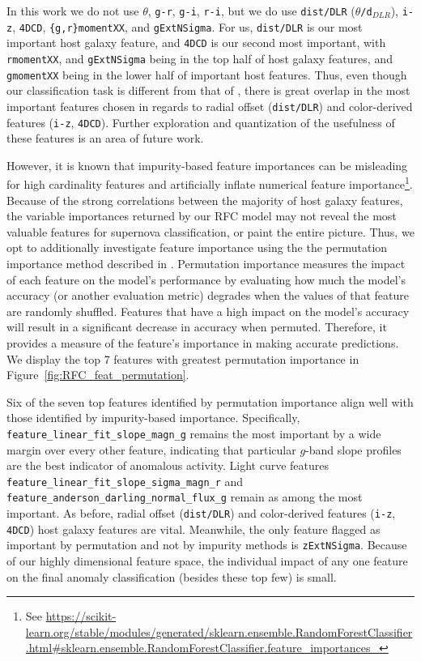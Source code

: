 \documentclass[twocolumn]{aastex63}
\begin{document}
In this work we do not use \texttt{$\theta$}, \texttt{g-r}, \texttt{g-i}, \texttt{r-i}, but we do use \texttt{dist/DLR} (\texttt{$\theta$/d$_{DLR}$}), \texttt{i-z}, \texttt{4DCD}, \texttt{\{g,r\}momentXX}, and \texttt{gExtNSigma}. For us, \texttt{dist/DLR} is our most important host galaxy feature, and \texttt{4DCD} is our second most important, with \texttt{rmomentXX}, and \texttt{gExtNSigma} being in the top half of host galaxy features, and \texttt{gmomentXX} being in the lower half of important host features. Thus, even though our classification task is different from that of \cite{Gagliano2021}, there is great overlap in the most important features chosen in regards to radial offset (\texttt{dist/DLR}) and color-derived features (\texttt{i-z}, \texttt{4DCD}). Further exploration and quantization of the usefulness of these features is an area of future work. \par

However, it is known that impurity-based feature importances can be misleading for high cardinality features and artificially inflate numerical feature importance\footnote{See \url{https://scikit-learn.org/stable/modules/generated/sklearn.ensemble.RandomForestClassifier.html\#sklearn.ensemble.RandomForestClassifier.feature\_importances\_}}. Because of the strong correlations between the majority of host galaxy features, the variable importances returned by our RFC model may not reveal the most valuable features for supernova classification, or paint the entire picture. Thus, we opt to additionally investigate feature importance using the the permutation importance method described in \cite{Breiman2001}. Permutation importance measures the impact of each feature on the model's performance by evaluating how much the model's accuracy (or another evaluation metric) degrades when the values of that feature are randomly shuffled. Features that have a high impact on the model's accuracy will result in a significant decrease in accuracy when permuted. Therefore, it provides a measure of the feature's importance in making accurate predictions. We display the top 7 features with greatest permutation importance in Figure~\ref{fig:RFC_feat_permutation}. \par


Six of the seven top features identified by permutation importance align well with those identified by impurity-based importance. Specifically, \texttt{feature\_linear\_fit\_slope\_magn\_g} remains the most important by a wide margin over every other feature, indicating that particular $g$-band slope profiles are the best indicator of anomalous activity. Light curve features \texttt{feature\_linear\_fit\_slope\_sigma\_magn\_r} and  \texttt{feature\_anderson\_darling\_normal\_flux\_g} remain as among the most important. As before, radial offset (\texttt{dist/DLR}) and color-derived features (\texttt{i-z}, \texttt{4DCD}) host galaxy features are vital. Meanwhile, the only feature flagged as important by permutation and not by impurity methods is \texttt{zExtNSigma}. Because of our highly dimensional feature space, the individual impact of any one feature on the final anomaly classification (besides these top few) is small. \par
\end{document}
